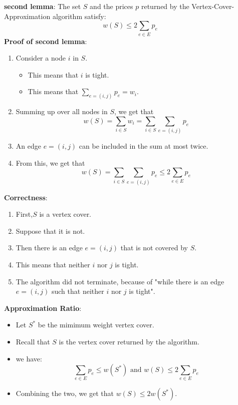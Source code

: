 \documentclass[onecolumn]{report}
\begin{document}
\noindent
\textbf{second lemma}: The set $S$ and the prices $p$ returned by the Vertex-Cover-Approximation algorithm satisfy: 
\begin{equation*}
    w(S) \leq 2 \sum_{e \in E} p_e
\end{equation*}
\textbf{Proof of second lemma}:\\
\begin{enumerate}
    \item Consider a node $i$ in $S$.
    \begin{itemize}
        \item This means that $i$ is tight.
        \item This means that $\sum_{e=(i,j)} p_e = w_i$.
    \end{itemize}
    \item Summing up over all nodes in $S$, we get that
    \begin{equation*}
        w(S)=\sum_{i \in S} w_i = \sum_{i \in S} \sum_{e=(i,j)} p_e
    \end{equation*}
    \item An edge $e=(i,j)$ can be included in the sum at most twice.
    \item From this, we get that
    \begin{equation*}
        w(S)=\sum_{i \in S} \sum_{e=(i,j)} p_e \leq 2 \sum_{e \in E} p_e
    \end{equation*}
\end{enumerate}
\textbf{Correctness}:
\begin{enumerate}
    \item First,$S$ is a vertex cover.
    \item Suppose that it is not.
    \item Then there is an edge $e=(i,j)$ that is not covered by $S$.
    \item This means that neither $i$ nor $j$ is tight.
    \item The algorithm did not terminate, because of "while there is an edge $e=(i,j)$ such that neither $i$ nor $j$ is tight".
\end{enumerate}
\textbf{Approximation Ratio}:
\begin{itemize}
    \item Let $S^*$ be the mimimum weight vertex cover.
    \item Recall that $S$ is the vertex cover returned by the algorithm.
    \item we have:
    \begin{equation*}
        \sum_{e \in E} p_e \leq w(S^*) \text{                   and         }
        w(S) \leq 2 \sum_{e \in E} p_e
    \end{equation*}
    \item Combining the two, we get that $w(S) \leq 2w(S^*)$.
\end{itemize}
\end{document}

